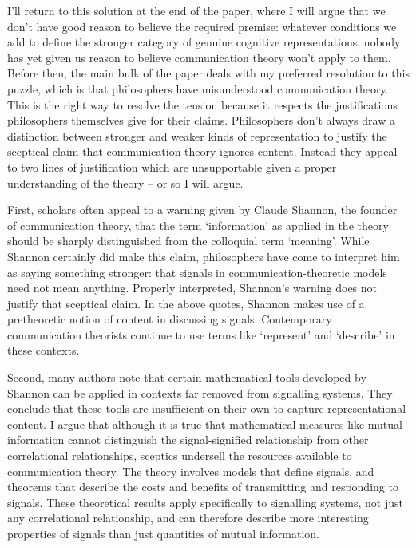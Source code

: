 \documentclass[12pt]{article}
\begin{document}
I'll return to this solution at the end of the paper, where I will argue that we don't have good reason to believe the required premise: whatever conditions we add to define the stronger category of genuine cognitive representations, nobody has yet given us reason to believe communication theory won't apply to them.
Before then, the main bulk of the paper deals with my preferred resolution to this puzzle, which is that philosophers have misunderstood communication theory.
This is the right way to resolve the tension because it respects the justifications philosophers themselves give for their claims.
Philosophers don't always draw a distinction between stronger and weaker kinds of representation to justify the sceptical claim that communication theory ignores content.
Instead they appeal to two lines of justification which are unsupportable given a proper understanding of the theory -- or so I will argue.

First, scholars often appeal to a warning given by Claude Shannon, the founder of communication theory, that the term `information' as applied in the theory should be sharply distinguished from the colloquial term `meaning'.
While Shannon certainly did make this claim, philosophers have come to interpret him as saying something stronger: that signals in communication-theoretic models need not mean anything.
Properly interpreted, Shannon's warning does not justify that sceptical claim.
In the above quotes, Shannon makes use of a pretheoretic notion of content in discussing signals.
Contemporary communication theorists continue to use terms like `represent' and `describe' in these contexts.

Second, many authors note that certain mathematical tools developed by Shannon can be applied in contexts far removed from signalling systems.
They conclude that these tools are insufficient on their own to capture representational content.
I argue that although it is true that mathematical measures like mutual information cannot distinguish the signal-signified relationship from other correlational relationships, sceptics undersell the resources available to communication theory.
The theory involves models that define signals, and theorems that describe the costs and benefits of transmitting and responding to signals.
These theoretical results apply specifically to signalling systems, not just any correlational relationship, and can therefore describe more interesting properties of signals than just quantities of mutual information.
\end{document}
